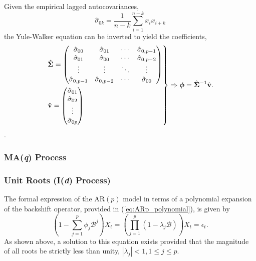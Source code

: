 \documentclass[12pt, twoside, draft]{article}
\begin{document}
Given the empirical lagged autocovariances,
\begin{equation}
\hat{\sigma}_{0k} = \frac{1}{n-k} \sum_{i=1}^{n-k} x_i x_{i+k}
\end{equation}
the Yule-Walker equation can be inverted to yield the coefficients,
\begin{equation}
\begin{rcases}
\hat{\boldsymbol{\Sigma}} =
\begin{pmatrix}
\hat{\sigma}_{00} & \hat{\sigma}_{01} & \cdots & \hat{\sigma}_{0,p-1} \\
\hat{\sigma}_{01} & \hat{\sigma}_{00} & \cdots & \hat{\sigma}_{0,p-2} \\
\vdots & \vdots & \ddots & \vdots \\
\hat{\sigma}_{0,p-1} & \hat{\sigma}_{0,p-2} & \cdots & \hat{\sigma}_{00}
\end{pmatrix} \\
\hat{\mathbf{v}} =
\begin{pmatrix}
\hat{\sigma}_{01} \\
\hat{\sigma}_{02} \\
\vdots \\
\hat{\sigma}_{0p}
\end{pmatrix}
\end{rcases}
\Rightarrow
\boldsymbol{\phi} = \hat{\boldsymbol{\Sigma}}^{-1} \hat{\mathbf{v}}.
\end{equation}.

\subsubsection{MA(\textit{q}) Process}

\subsubsection{Unit Roots (I(\textit{d}) Process)}
The formal expression of the AR$(p)$ model in terms of a polynomial expansion of the backshift operator, provided in (\ref{eq:ARp_polynomial}), is given by 
\begin{equation}
\left(1 - \sum_{j=1}^p \phi_j \mathcal{B}^j \right) X_t = \left( \prod_{j=1}^p \left( 1 - \lambda_j \mathcal{B} \right) \right) X_t = \epsilon_t.
\end{equation}
As shown above, a solution to this equation exists provided that the magnitude of all roots be strictly less than unity, $|\lambda_j| < 1, 1 \leq j \leq p$.
\end{document}

